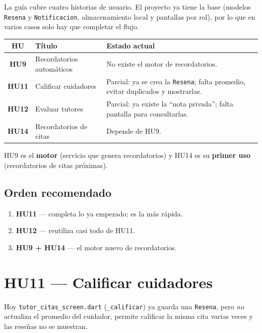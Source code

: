 \documentclass[11pt,a4paper]{article}
\newcommand{\hu}[1]{\textcolor{appPrimary}{\textbf{#1}}}
\begin{document}
La guía cubre cuatro historias de usuario. El proyecto ya tiene la base
(modelos \texttt{Resena} y \texttt{Notificacion}, almacenamiento local y
pantallas por rol), por lo que en varios casos solo hay que completar el flujo.

\begin{center}
\renewcommand{\arraystretch}{1.5}
\begin{tabularx}{\linewidth}{c >{\raggedright\arraybackslash}p{4.5cm} >{\raggedright\arraybackslash}X}
\toprule
\rowcolor{appPrimaryLight}
\textbf{HU} & \textbf{Título} & \textbf{Estado actual} \\
\midrule
\hu{HU9}  & Recordatorios automáticos & No existe el motor de recordatorios. \\
\hu{HU11} & Calificar cuidadores      & Parcial: ya se crea la \texttt{Resena}; falta promedio, evitar duplicados y mostrarlas. \\
\hu{HU12} & Evaluar tutores           & Parcial: ya existe la ``nota privada''; falta pantalla para consultarlas. \\
\hu{HU14} & Recordatorios de citas    & Depende de HU9. \\
\bottomrule
\end{tabularx}
\end{center}

\begin{nota}
HU9 es el \textbf{motor} (servicio que genera recordatorios) y HU14 es su
\textbf{primer uso} (recordatorios de citas próximas).
\end{nota}

\subsection*{Orden recomendado}
\begin{enumerate}
  \item \hu{HU11} — completa lo ya empezado; es la más rápida.
  \item \hu{HU12} — reutiliza casi todo de HU11.
  \item \hu{HU9 + HU14} — el motor nuevo de recordatorios.
\end{enumerate}

\section{HU11 — Calificar cuidadores}

Hoy \texttt{tutor\_citas\_screen.dart} (\texttt{\_calificar}) ya guarda una
\texttt{Resena}, pero \emph{no} actualiza el promedio del cuidador, permite
calificar la misma cita varias veces y las reseñas no se muestran.
\end{document}
